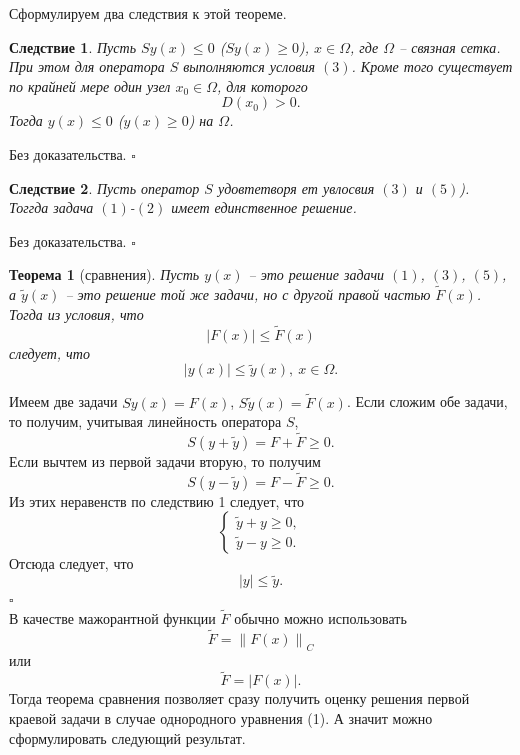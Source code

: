 \documentclass[a4paper, 12pt]{report}
\numberwithin{equation}{section}
\newenvironment{Proof} %
{\par\noindent{$\blacklozenge$}} %
{\hfill$\scriptstyle\square$}
\renewcommand{\leq}{\leqslant}
\renewcommand{\geq}{\geqslant}
\newcommand\Norm[1]{\left\| #1 \right\|}
\newtheorem*{theorem}{Теорема}
\newtheorem*{cor}{Следствие}
\begin{document}
		Сформулируем два следствия к этой теореме.
		\begin{cor}
			Пусть $Sy(x) \leq 0$ ($Sy(x) \geq 0$), $x \in \Omega$, где $\Omega$ -- связная сетка. При этом для оператора $S$ выполняются условия $(3)$. Кроме того существует по крайней мере один узел $x_0 \in \Omega$, для которого \begin{equation}
				D(x_0) > 0.
			\end{equation}
			Тогда $y(x) \leq 0$ ($y(x)\geq 0$) на $\Omega$.
		\end{cor}
		\begin{Proof}
			Без доказательства.
		\end{Proof}
		\begin{cor}
			Пусть оператор $S$ удовтетворя ет увлосвия $(3)$ и $(5)$). Тоггда задача $(1)$-$(2)$ имеет единственное решение.
		\end{cor}
		\begin{Proof}
			Без доказательства.
		\end{Proof}
		\begin{theorem} [сравнения]
			Пусть $y(x)$ -- это решение задачи $(1)$, $(3)$, $(5)$, а $\tilde y(x)$ -- это решение той же задачи, но с другой правой частью $\tilde F (x)$. Тогда из условия, что \begin{equation*}
				|F(x)| \leq \tilde F(x)
			\end{equation*}
			следует, что \begin{equation*}
				|y(x)|\leq \tilde y(x),\ x \in \Omega.
			\end{equation*}
		\end{theorem}
		\begin{Proof}
			Имеем две задачи $Sy(x) = F(x)$, $S \tilde y(x) = \tilde F(x)$. Если сложим обе задачи, то получим, учитывая линейность оператора $S$,
			$$S(y + \tilde y) = F + \tilde F \geq 0.$$
			Если вычтем из первой задачи вторую, то получим
			$$S(y - \tilde y) = F - \tilde F \geq 0.$$
			Из этих неравенств по следствию 1 следует, что $$\begin{cases}
				\tilde y + y \geq 0,\\ \tilde y - y \geq 0.
			\end{cases}$$
			Отсюда следует, что
			$$|y|\leq \tilde y.$$
		\end{Proof}\\
		В качестве мажорантной функции $\tilde F$ обычно можно использовать 
		$$\tilde F = \Norm{F(x)}_C$$
		или
		$$\tilde F = |F(x)|.$$
		Тогда теорема сравнения позволяет сразу получить оценку решения первой краевой задачи в случае однородного уравнения (1). А значит можно сформулировать следующий результат.
\end{document}
